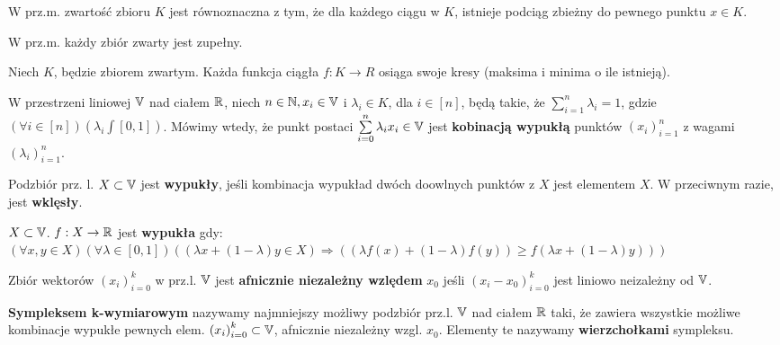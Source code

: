 \begin{fakt}
    W prz.m. zwartość zbioru $K$ jest równoznaczna z tym, że dla każdego ciągu w $K$, istnieje podciąg zbieżny do pewnego punktu $x \in K$.
\end{fakt}

\begin{fakt}
    W prz.m. każdy zbiór zwarty jest zupełny.
\end{fakt}

\begin{twierdzenie}
    Niech $K$, będzie zbiorem zwartym. Każda funkcja ciągła $f: K \rightarrow R$ osiąga swoje kresy (maksima i minima o ile istnieją).
\end{twierdzenie}

\begin{definicja}
    W przestrzeni liniowej $\mathbb{V}$ nad ciałem $\mathbb{R}$, niech $n \in \mathbb{N}, x_i \in \mathbb{V}$ i $\lambda_i \in K$, dla $i \in [n]$,
    będą takie, że $\sum\limits_{i=1}^{n}\lambda_i = 1$, gdzie $(\forall i \in [n])(\lambda_i \int [0, 1])$. Mówimy wtedy, że punkt postaci
    $\sum\limits_{i=0}^{n} \lambda_i x_i \in \mathbb{V}$ jest \textbf{kobinacją wypukłą} punktów ${(x_i)}^{n}_{i=1}$ z wagami ${(\lambda_i)}^{n}_{i=1}$.
\end{definicja}

\begin{definicja}
    Podzbiór prz. l. $X \subset \mathbb{V}$ jest \textbf{wypukły}, jeśli kombinacja wypukład dwóch doowlnych punktów z $X$ jest elementem $X$.
    W przeciwnym razie, jest \textbf{wklęsły}.
\end{definicja}

\begin{definicja}
    $X \subset \mathbb{V}$. $f: X \rightarrow \mathbb{R}$ jest \textbf{wypukła} gdy: 
    $(\forall x, y \in X)(\forall \lambda \in [0, 1])((\lambda x + (1 - \lambda)y \in X) \Rightarrow ((\lambda f(x) + (1 - \lambda)f(y)) \geq f(\lambda x + ( 1 - \lambda)y)))$
\end{definicja}

\begin{definicja}
    Zbiór wektorów ${(x_i)}^{k}_{i=0}$ w prz.l. $\mathbb{V}$ jest \textbf{afnicznie niezależny wzlędem} $x_0$ jeśli ${(x_i - x_0)}_{i=0}^{k}$ 
    jest liniowo neizależny od $\mathbb{V}$.
\end{definicja}

\begin{definicja}
    \textbf{Sympleksem k-wymiarowym} nazywamy najmniejszy możliwy podzbiór prz.l. $\mathbb{V}$ nad ciałem $\mathbb{R}$ taki,
    że zawiera wszystkie możliwe kombinacje wypukłe pewnych elem. ${(x_i)}_{i=0}^{k} \subset \mathbb{V}$,
     afnicznie niezależny wzgl. $x_0$.
    Elementy te nazywamy \textbf{wierzchołkami} sympleksu.
\end{definicja}

